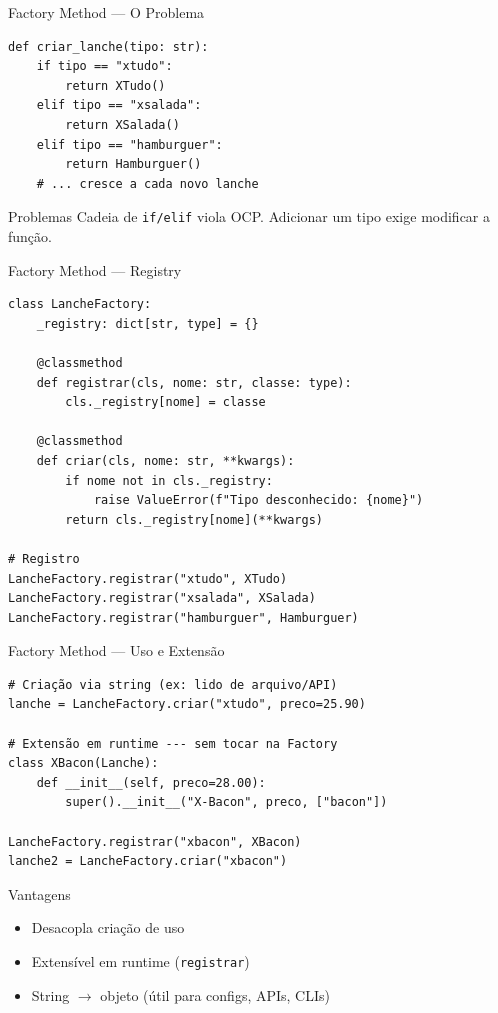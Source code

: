 \documentclass[aspectratio=169]{beamer}
\begin{document}
\begin{frame}[fragile]{Factory Method --- O Problema}
\begin{lstlisting}
def criar_lanche(tipo: str):
    if tipo == "xtudo":
        return XTudo()
    elif tipo == "xsalada":
        return XSalada()
    elif tipo == "hamburguer":
        return Hamburguer()
    # ... cresce a cada novo lanche
\end{lstlisting}

\begin{alertblock}{Problemas}
Cadeia de \texttt{if/elif} viola OCP. Adicionar um tipo exige modificar a função.
\end{alertblock}
\end{frame}

\begin{frame}[fragile]{Factory Method --- Registry}
\begin{lstlisting}
class LancheFactory:
    _registry: dict[str, type] = {}

    @classmethod
    def registrar(cls, nome: str, classe: type):
        cls._registry[nome] = classe

    @classmethod
    def criar(cls, nome: str, **kwargs):
        if nome not in cls._registry:
            raise ValueError(f"Tipo desconhecido: {nome}")
        return cls._registry[nome](**kwargs)

# Registro
LancheFactory.registrar("xtudo", XTudo)
LancheFactory.registrar("xsalada", XSalada)
LancheFactory.registrar("hamburguer", Hamburguer)
\end{lstlisting}
\end{frame}

\begin{frame}[fragile]{Factory Method --- Uso e Extensão}
\begin{lstlisting}
# Criação via string (ex: lido de arquivo/API)
lanche = LancheFactory.criar("xtudo", preco=25.90)

# Extensão em runtime --- sem tocar na Factory
class XBacon(Lanche):
    def __init__(self, preco=28.00):
        super().__init__("X-Bacon", preco, ["bacon"])

LancheFactory.registrar("xbacon", XBacon)
lanche2 = LancheFactory.criar("xbacon")
\end{lstlisting}

\begin{exampleblock}{Vantagens}
\begin{itemize}
  \item Desacopla criação de uso
  \item Extensível em runtime (\texttt{registrar})
  \item String $\to$ objeto (útil para configs, APIs, CLIs)
\end{itemize}
\end{exampleblock}
\end{frame}
\end{document}

